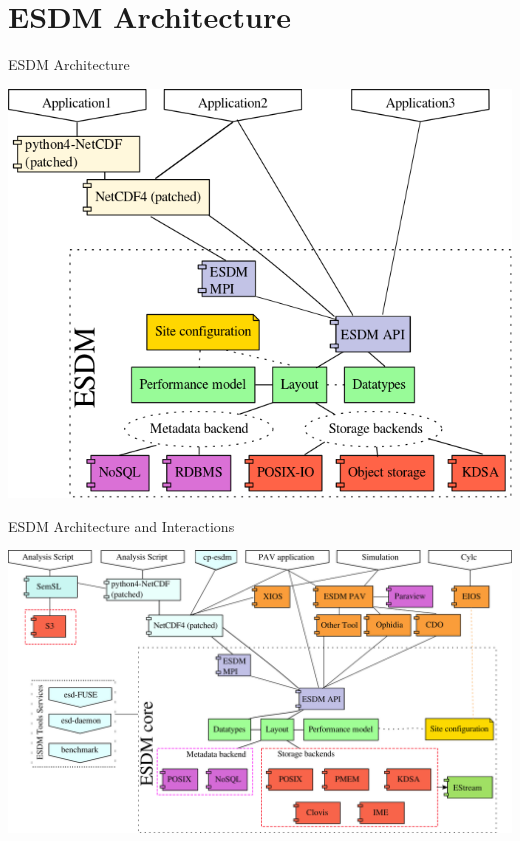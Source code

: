 \documentclass[compress,11pt,xcolor=svgnames,aspectratio=169]{beamer}
\begin{document}
\acknowledgement

\appendix

\begin{frame}[fragile]{}

{ \huge \color{EsiBlue}{ Appendix}}

\end{frame}

\section{ESDM Architecture}

\begin{frame}[fragile]{ESDM Architecture}

\begin{center}
\includegraphics[scale=0.35]{fig/esdm-arch1}
\end{center}

\end{frame}

\begin{frame}[fragile]{ESDM Architecture and Interactions}

\begin{center}
\includegraphics[scale=0.3]{fig/esdm-arch2}
\end{center}

\end{frame}
\end{document}
